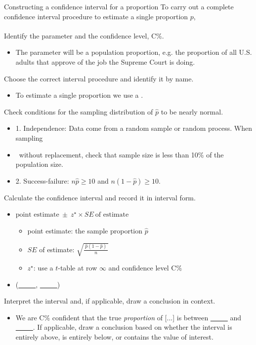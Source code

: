 \begin{onebox}{Constructing a confidence interval for a proportion}
To carry out a complete confidence interval procedure to estimate a single proportion $p$,
\\
\\
 Identify the parameter and the confidence level, C\%. \vspace{-1mm}
\begin{itemize} 
\item[] The parameter will be a population proportion, e.g. the proportion of all U.S. adults that approve of the job the Supreme Court is doing.
\end{itemize}
 Choose the correct interval procedure and identify it by name. \vspace{-1mm}
\begin{itemize} 
\item[] To estimate a single proportion we use a .
\end{itemize}
 Check conditions for the sampling distribution of $\hat{p}$ to be nearly normal.  \vspace{-1mm}
\begin{itemize}
\setlength{\itemsep}{0mm}
\item[] 1. Independence:  Data come from a random sample or random process.  When sampling 
\item[] \quad \ without replacement, check that sample size is less than 10\% of the population size.
\item[] 2. Success-failure:  $n\hat{p}\ge 10$ and $n(1-\hat{p})\ge 10$.
\end{itemize}
 Calculate the confidence interval and record it in interval form.
\begin{itemize}
\item[] $\text{point estimate}\ \pm\ z^{\star} \times SE\ \text{of estimate}$
\begin{itemize}
\item[] point estimate: the sample proportion $\hat{p}$
\item[] $SE$ of estimate:  $\sqrt{\frac{\ \hat{p}(1-\hat{p})\ }{n}}$
\item[] $z^{\star}$: use a $t$-table at row $\infty$ and confidence level C\%
\end{itemize}
\item[] (\underline{\ \ \ \ \ }, \underline{\ \ \ \ \ })
\end{itemize}
 Interpret the interval and, if applicable, draw a conclusion in context.\vspace{-1mm}
\begin{itemize}
\item[] We are C\%  confident that the true \emph{proportion} of [...] is between \underline{\ \ \ \ \ } and  \underline{\ \ \ \ \ }. If applicable, draw a conclusion based on whether the interval is entirely above, is entirely below, or contains the value of interest. 
\end{itemize}\end{onebox}


